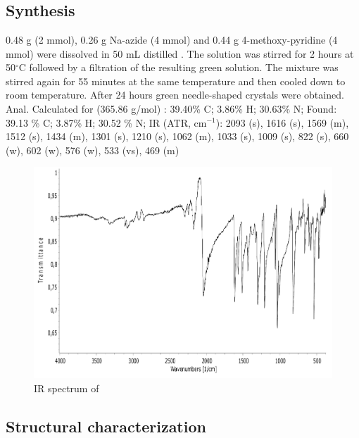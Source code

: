 \section{}
\subsection{Synthesis}
0.48 g  (2 mmol), 0.26 g Na-azide (4 mmol) and 0.44 g 4-methoxy-pyridine (4 mmol) were dissolved in 50 mL distilled . The solution was stirred for 2 hours  at 50$^\circ$C followed by a filtration of the resulting green solution. The mixture was stirred again for 55 minutes at the same temperature and then cooled down to room temperature. After 24 hours green needle-shaped crystals were obtained. Anal. Calculated for  (365.86 g/mol) : 39.40\% C; 3.86\% H; 30.63\% N; Found: 39.13 \% C; 3.87\% H; 30.52 \% N; IR (ATR, cm$^{-1}$): 2093 (s), 1616 (s), 1569 (m), 1512 (s), 1434 (m), 1301 (s), 1210 (s), 1062 (m), 1033 (s), 1009 (s), 822 (s), 660 (w), 602 (w), 576 (w), 533 (vs), 469 (m)


\begin{figure}[h!]
\centering
\includegraphics[width=1\textwidth]{figures/CuA4MOP-IR.pdf}
\caption{IR spectrum of }
\end{figure}

\subsection{Structural characterization}

